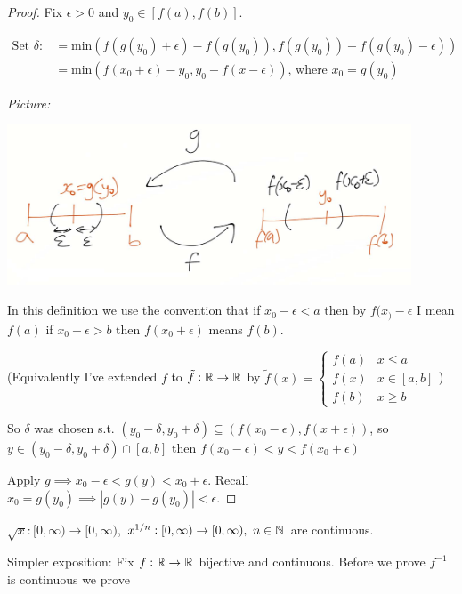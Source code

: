 \documentclass[twoside]{scrartcl}
\begin{document}
\begin{proof}
Fix $\epsilon >0$ and $y_0 \in [f(a),f(b)]$. 

\[\begin{aligned}
\mbox{Set }\delta:&= \mathrm{min}(f(g(y_0) + \epsilon) - f(g(y_0)), f(g(y_0)) - f(g(y_0) - \epsilon))\\
	&= \mathrm{min}(f(x_0 + \epsilon) -  y_0, y_0 - f(x-\epsilon))\mbox{, where }x_0 = g(y_0)
\end{aligned}\]

\emph{Picture:} 
\begin{center}
\includegraphics[width = 12cm]{ball2.jpg}
\end{center}

In this definition we use the convention that if $x_0 -\epsilon <a$ then by $f(x_) - \epsilon$ I mean $f(a)$ if $x_0 + \epsilon > b$ then $f(x_0 + \epsilon)$ means $f(b)$. 

(Equivalently I've extended $f$ to $\tilde f: \mathbb{R} \to \mathbb{R}$ by $\tilde f(x) =\begin{cases}
f(a) & x \leq a\\
f(x) & x \in [a,b]\\
f(b) & x \geq b
\end{cases}
$)

So $\delta$ was chosen s.t. $(y_0 -\delta, y_0 + \delta) \subseteq (f(x_0 - \epsilon), f(x+\epsilon))$, so $y \in (y_0 - \delta, y_0 + \delta) \cap [a,b]$ then $f(x_0 -\epsilon) < y < f(x_0 + \epsilon)$

Apply $g\implies x_0 -\epsilon < g(y) < x_0 + \epsilon$. Recall $x_0 = g(y_0) \implies |g(y) - g(y_0)| < \epsilon$.
\end{proof}

\begin{corollary}
$\sqrt{x}: [0,\infty) \to [0,\infty)$, $x^{1/n}: [0,\infty) \to [0,\infty),~n\in\mathbb{N}$ are continuous. 	
\end{corollary}

Simpler exposition: Fix $f: \mathbb{R} \to \mathbb{R}$ bijective and continuous. Before we prove $f^{-1}$ is continuous we prove
\end{document}
